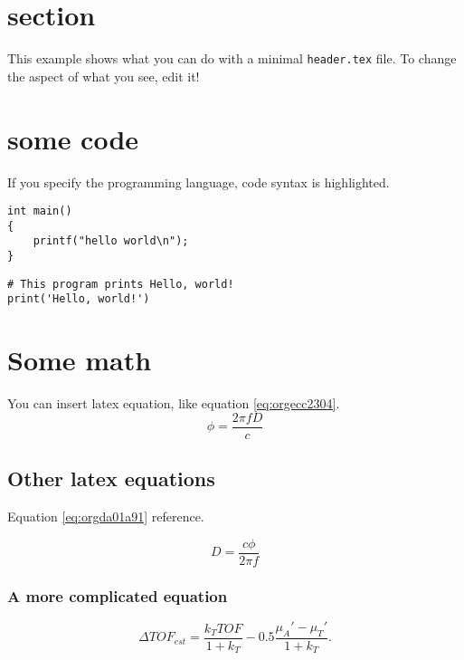 


\maketitle

\newpage

\section{section}
\label{sec:org1d08d0a}
This example shows what you can do with a minimal \texttt{header.tex} file.
To change the aspect of what you see, edit it!

\section{some code}
\label{sec:orgb9f20ec}
If you specify the programming language, code syntax is highlighted.
\begin{verbatim}
int main()
{
    printf("hello world\n");
}
\end{verbatim}

\begin{verbatim}
# This program prints Hello, world!
print('Hello, world!')
\end{verbatim}

\section{Some math}
\label{sec:orgc84c9b1}
You can insert latex equation, like equation \ref{eq:orgecc2304}.
\begin{equation}
\label{eq:orgecc2304}
\phi = \frac{2\pi fD}{c}
\end{equation}
\subsection{Other latex equations}
\label{sec:org23b8696}
Equation \ref{eq:orgda01a91} reference.

\begin{equation}
\label{eq:orgda01a91}
D = \frac{c\phi}{2\pi f}
\end{equation}

\subsubsection{A more complicated equation}
\label{sec:org3de4e98}

\begin{equation}
\Delta TOF_{est} = \frac{k_T TOF}{1+k_T } - 0.5 \frac{\mu_A' - \mu_T'}{1+k_T}.
\end{equation}

